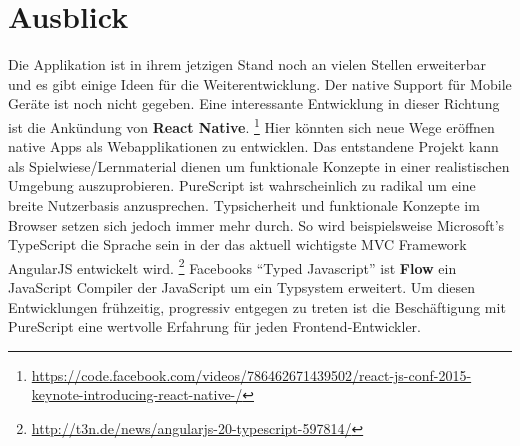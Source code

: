 \section{Ausblick}
Die Applikation ist in ihrem jetzigen Stand noch an vielen Stellen
erweiterbar und es gibt einige Ideen für die Weiterentwicklung. Der
native Support für Mobile Geräte ist noch nicht gegeben. Eine
interessante Entwicklung in dieser Richtung ist die Ankündung von
\textbf{React Native}.
\footnote{\url{https://code.facebook.com/videos/786462671439502/react-js-conf-2015-keynote-introducing-react-native-/}}
Hier könnten sich neue Wege eröffnen native Apps als Webapplikationen
zu entwicklen. Das entstandene Projekt kann als
Spielwiese/Lernmaterial dienen um funktionale Konzepte in einer
realistischen Umgebung auszuprobieren. PureScript ist wahrscheinlich
zu radikal um eine breite Nutzerbasis anzusprechen. Typsicherheit und
funktionale Konzepte im Browser setzen sich jedoch immer mehr durch.
So wird beispielsweise Microsoft's TypeScript die Sprache sein in der
das aktuell wichtigste MVC Framework AngularJS entwickelt wird.
\footnote{\url{http://t3n.de/news/angularjs-20-typescript-597814/}}
Facebooks ``Typed Javascript'' ist \textbf{Flow} ein JavaScript
Compiler der JavaScript um ein Typsystem erweitert. Um
diesen Entwicklungen frühzeitig, progressiv entgegen zu treten ist die
Beschäftigung mit PureScript eine wertvolle Erfahrung für jeden
Frontend-Entwickler.

